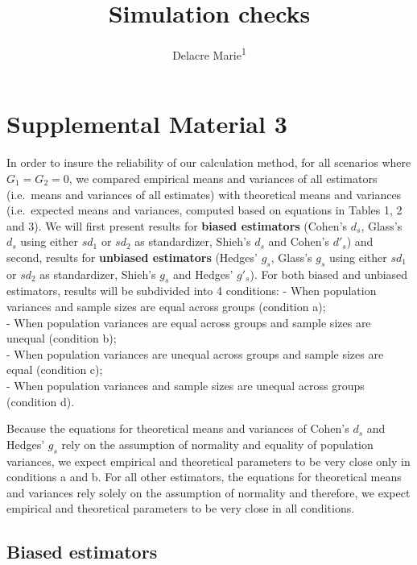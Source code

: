\documentclass[
  man]{apa6}
\affiliation{
\vspace{0.5cm}
\textsuperscript{1} ULB}
\title{Simulation checks}
\author{Delacre Marie\textsuperscript{1}}
\date{}
\begin{document}
\maketitle

\hypertarget{supplemental-material-3}{%
\section{Supplemental Material 3}\label{supplemental-material-3}}

In order to insure the reliability of our calculation method, for all scenarios where \(G_1=G_2=0\), we compared empirical means and variances of all estimators (i.e.~means and variances of all estimates) with theoretical means and variances (i.e.~expected means and variances, computed based on equations in Tables 1, 2 and 3). We will first present results for \textbf{biased estimators} (Cohen's \(d_s\), Glass's \(d_s\) using either \(sd_1\) or \(sd_2\) as standardizer, Shieh's \(d_s\) and Cohen's \(d'_s\)) and second, results for \textbf{unbiased estimators} (Hedges' \(g_s\), Glass's \(g_s\) using either \(sd_1\) or \(sd_2\) as standardizer, Shieh's \(g_s\) and Hedges' \(g'_s\)). For both biased and unbiased estimators, results will be subdivided into 4 conditions:
- When population variances and sample sizes are equal across groups (condition a);\\
- When population variances are equal across groups and sample sizes are unequal (condition b);\\
- When population variances are unequal across groups and sample sizes are equal (condition c);\\
- When population variances and sample sizes are unequal across groups (condition d).

Because the equations for theoretical means and variances of Cohen's \(d_s\) and Hedges' \(g_s\) rely on the assumption of normality and equality of population variances, we expect empirical and theoretical parameters to be very close only in conditions a and b. For all other estimators, the equations for theoretical means and variances rely solely on the assumption of normality and therefore, we expect empirical and theoretical parameters to be very close in all conditions.

\hypertarget{biased-estimators}{%
\subsection{Biased estimators}\label{biased-estimators}}
\end{document}
